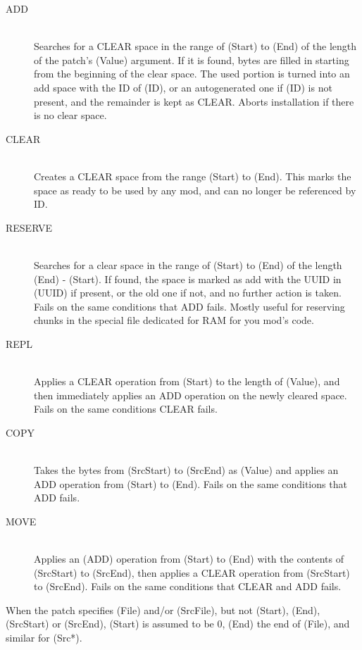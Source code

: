 \documentclass[12pt,a4paper,notitlepage]{article}
\begin{document}
\begin{description}
\item[ADD] \hfill \\ 
    Searches for a CLEAR space in the range of (Start) to (End) of the length of the patch's (Value) argument. If it is found, bytes are filled in starting from the beginning of the clear space. The used portion is turned into an add space with the ID of (ID), or an autogenerated one if (ID) is not present, and the remainder is kept as CLEAR. Aborts installation if there is no clear space.
\item[CLEAR] \hfill \\
    Creates a CLEAR space from the range (Start) to (End). This marks the space as ready to be used by any mod, and can no longer be referenced by ID.
\item[RESERVE] \hfill \\
    Searches for a clear space in the range of (Start) to (End) of the length (End) - (Start). If found, the space is marked as add with the UUID in (UUID) if present, or the old one if not, and no further action is taken. Fails on the same conditions that ADD fails. Mostly useful for reserving chunks in the special file dedicated for RAM for you mod's code.
\item[REPL] \hfill \\
    Applies a CLEAR operation from (Start) to the length of (Value), and then immediately applies an ADD operation on the newly cleared space. Fails on the same conditions CLEAR fails.
\item[COPY] \hfill \\
    Takes the bytes from (SrcStart) to (SrcEnd) as (Value) and applies an ADD operation from (Start) to (End). Fails on the same conditions that ADD fails.
\item[MOVE] \hfill \\
    Applies an (ADD) operation from (Start) to (End) with the contents of (SrcStart) to (SrcEnd), then applies a CLEAR operation from (SrcStart) to (SrcEnd). Fails on the same conditions that CLEAR and ADD fails.
\end{description}

When the patch specifies (File) and/or (SrcFile), but not (Start), (End), (SrcStart) or (SrcEnd), (Start) is assumed to be 0, (End) the end of (File), and similar for (Src*).
\end{document}
